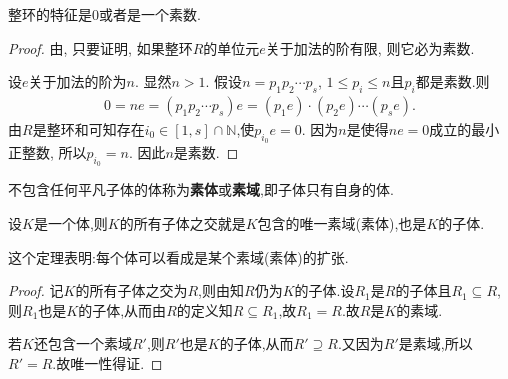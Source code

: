 \documentclass[../../main.tex]{subfiles}%
\begin{document}
\begin{theorem}
整环的特征是0或者是一个素数.
\end{theorem}
\begin{proof}

由, 只要证明, 如果整环$R$的单位元$e$关于加法的阶有限, 则它必为素数.

设$e$关于加法的阶为$n$. 显然$n > 1$. 假设$n = p_1p_2\cdots p_s$, $1 \leqslant p_i \leqslant n$且$p_i$都是素数.则
\begin{align*}
0=ne=(p_1p_2\cdots p_s)e=\left( p_1e \right) \cdot \left( p_2e \right) \cdots \left( p_se \right) .
\end{align*}
由$R$是整环和可知存在$i_0\in [1,s]\cap \mathbb{N}$,使$p_{i_0}e=0$. 因为$n$是使得$ne = 0$成立的最小正整数, 所以$p_{i_0} = n$. 因此$n$是素数.

\end{proof}

\begin{definition}[素域/素体]
不包含任何平凡子体的体称为\textbf{素体}或\textbf{素域},即子体只有自身的体.
\end{definition}

\begin{theorem}\label{theorem:每个体必包含唯一的一个素体为其子体}
设$K$是一个体,则$K$的所有子体之交就是$K$包含的唯一素域(素体),也是$K$的子体.
\end{theorem}
\begin{remark}
这个定理表明:每个体可以看成是某个素域(素体)的扩张.
\end{remark}
\begin{proof}

记$K$的所有子体之交为$R$,则由知$R$仍为$K$的子体.设$R_1$是$R$的子体且$R_1\subseteq R$,则$R_1$也是$K$的子体,从而由$R$的定义知$R\subseteq R_1$,故$R_1=R$.故$R$是$K$的素域.

若$K$还包含一个素域$R'$,则$R'$也是$K$的子体,从而$R'\supseteq R$.又因为$R'$是素域,所以$R'=R$.故唯一性得证.

\end{proof}
\end{document}
